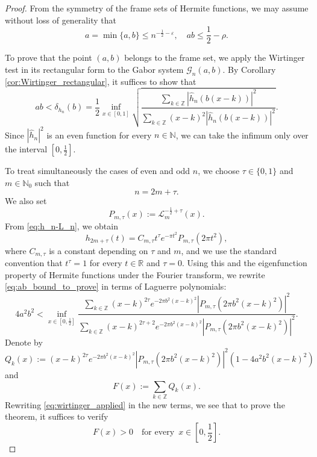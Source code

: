 \documentclass[11pt]{amsart}
\numberwithin{equation}{section}
\newcommand{\R}{{\mathbb R}}
\newcommand{\N}{{\mathbb N}}
\begin{document}
\begin{proof}
        From the symmetry of the frame sets of Hermite functions, we may assume without loss of generality that
    \begin{equation}\label{eq:ab_far_a}
        a=\min\{a,b\} \leq n^{-\frac{1}{2}-\varepsilon}, \quad ab \leq \frac{1}{2}-\rho.
    \end{equation}

    To prove that the point $(a,b)$ belongs to the frame set, we apply the Wirtinger test in its rectangular form to the Gabor system $\mathcal{G}_n(a,b)$. By Corollary \ref{cor:Wirtinger_rectangular}, it suffices to show that
\begin{equation}\label{eq:ab_bound_to_prove}
    ab < \delta_{h_n}(b)= \frac{1}{2} \inf_{x\in[0,1]}
    \sqrt{\frac{\displaystyle\sum_{k\in\mathbb Z}|\widehat h_n(b(x-k))|^2}{\displaystyle\sum_{k\in\mathbb Z}(x-k)^2|\widehat h_n(b(x-k))|^2}}.
\end{equation}
Since $|\widehat h_n|^2$ is an even function for every $n\in \N$, we can take the infimum only over the interval $[0,\frac{1}{2}]$.

To treat simultaneously the cases of even and odd $n$, we choose $\tau\in\{0,1\}$ and $m\in \N_0$ such that
\begin{equation}
n=2m+\tau.
\end{equation}
We also set 
\begin{equation}
     P_{m,\tau}(x):= {\mathcal{L}}^{-\frac{1}{2}+\tau}_{m}(x).
\end{equation}
From \eqref{eq:h_n-L_n}, we obtain
$$
h_{2m+\tau}(t) = C_{m,\tau} t^{\tau} e^{-\pi t^2} P_{m,\tau}(2\pi t^2),
$$
where $C_{m,\tau}$ is a constant depending on $\tau$ and $m$, and we use the standard convention that $t^{\tau} = 1$ for every $t\in \R$ and $\tau=0$.
Using this and the eigenfunction property of Hermite functions under the Fourier transform, we rewrite \eqref{eq:ab_bound_to_prove} in terms of Laguerre polynomials:
\begin{equation}\label{eq:wirtinger_applied}
    4a^2 b^2 < \inf_{x\in[0,\frac{1}{2}]}
    \frac{\displaystyle\sum_{k\in\mathbb Z} (x-k)^{2\tau} e^{-2\pi b^2(x-k)^2}|P_{m,\tau}(2\pi b^2(x-k)^2)|^2}{\displaystyle\sum_{k\in\mathbb Z}(x-k)^{2\tau+2} e^{-2\pi b^2(x-k)^2}|P_{m,\tau}(2\pi b^2(x-k)^2)|^2}.
\end{equation}
Denote by 
$$
Q_k(x) := (x-k)^{2\tau}e^{-2\pi b^2(x-k)^2}|P_{m,\tau}(2\pi b^2(x-k)^2)|^2 \left(1-4a^2b^2 (x-k)^2\right)
$$
and
$$
F(x):=\sum_{k\in\mathbb Z} Q_k(x).
$$
Rewriting \eqref{eq:wirtinger_applied} in the new terms, we see that to prove the theorem, it suffices to verify
\begin{equation}\label{eq:F_positive}
F(x)> 0    \quad \text{for every }\, x\in\left[0,\frac{1}{2}\right].
\end{equation}


\end{proof}
\end{document}
